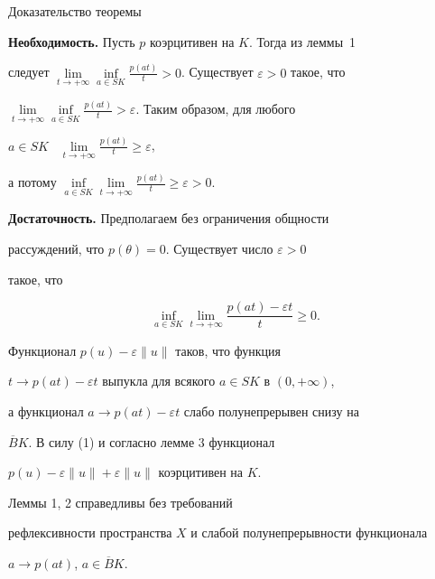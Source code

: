 \begin{pf*}{Доказательство теоремы}


{\bf Необходимость.} Пусть $p$ коэрцитивен на $K$. Тогда из леммы~1 


следует $\lim\limits_{t \to +\infty}\inf\limits_{a \in SK}


\frac{p(at)}{t} >0$. Существует $\varepsilon > 0$ такое, что


$\lim\limits_{t \to +\infty}\inf\limits_{a \in SK}


\frac{p(at)}{t} > \varepsilon$. Таким образом, для любого


$a \in SK$ \ $\lim\limits_{t \to +\infty}\frac{p(at)}{t}


\ge \varepsilon $,


а потому $\inf\limits_{a \in SK}\lim\limits_{t \to +\infty}


\frac{p(at)}{t} \ge \varepsilon > 0$.


\smallskip





{\bf Достаточность.} Предполагаем без ограничения общности


рассуждений, что $p(\theta)=0$. Существует число $\varepsilon > 0$


такое, что


\begin{equation}


\inf_{a \in SK}\lim_{t \to +\infty}\frac{p(at)-\varepsilon t}{t} \ge 0.


\end{equation}


Функционал $p(u)-\varepsilon \|u\|$ таков, что функция


$t \to p(at)-\varepsilon t$ выпукла для всякого $a \in SK$ в $(0,+\infty)$,


а функционал $a \to p(at)-\varepsilon t$ слабо полунепрерывен снизу на


$\overline{B}K$. В силу (1) и согласно лемме 3 функционал


$p(u)-\varepsilon \|u\| + \varepsilon \|u\|$ коэрцитивен на $K$.


\end{pf*}





\begin{notenonum}


Леммы 1, 2 справедливы без требований


рефлексивности пространства $X$ и слабой полунепрерывности функционала


$a \to p(at)$, $a \in \overline{B}K$.


\end{notenonum}








